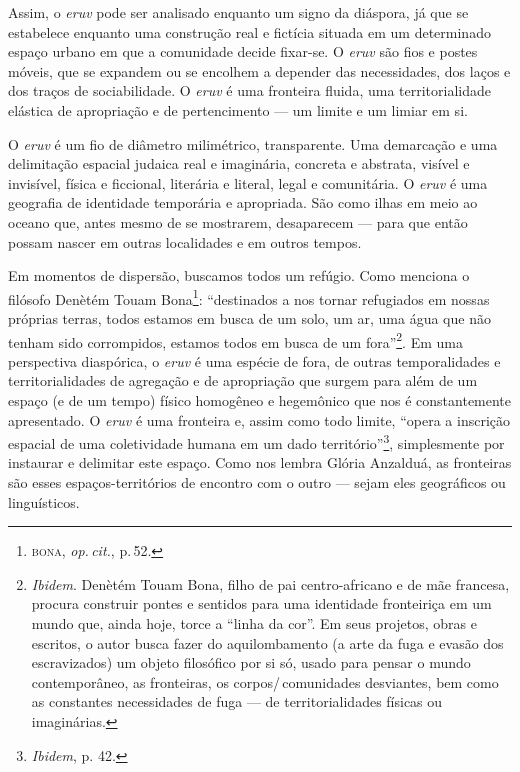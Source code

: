 Assim, o \emph{eruv} pode ser analisado enquanto um signo da diáspora,
já que se estabelece enquanto uma construção real e fictícia situada em
um determinado espaço urbano em que a comunidade decide fixar-se. O
\emph{eruv} são fios e postes móveis, que se expandem ou se encolhem a
depender das necessidades, dos laços e dos traços de sociabilidade. O
\emph{eruv} é uma fronteira fluida, uma territorialidade elástica de
apropriação e de pertencimento --- um limite e um limiar em si.

\begin{center}\end{center}

\noindent{}O \emph{eruv} é um fio de diâmetro milimétrico, transparente. Uma
demarcação e uma delimitação espacial judaica real e imaginária,
concreta e abstrata, visível e invisível, física e ficcional, literária
e literal, legal e comunitária. O \emph{eruv} é uma geografia de
identidade temporária e apropriada. São como ilhas em meio ao oceano
que, antes mesmo de se mostrarem, desaparecem --- para que então possam
nascer em outras localidades e em outros tempos.

Em momentos de dispersão, buscamos todos um refúgio. Como
menciona o filósofo Denètém Touam Bona\footnote{\textsc{bona}, \emph{op.\,cit.}, p.\,52.}:
``destinados a nos tornar refugiados em nossas próprias terras,
todos estamos em busca de um solo, um ar, uma água que não tenham sido
corrompidos, estamos todos em busca de um fora''\footnote{\emph{Ibidem}.
  Denètém Touam Bona, filho de pai centro-africano e de mãe francesa,
  procura construir pontes e sentidos para uma identidade fronteiriça em
  um mundo que, ainda hoje, torce a ``linha da cor''. Em seus
  projetos, obras e escritos, o autor busca fazer do aquilombamento (a
  arte da fuga e evasão dos escravizados) um objeto filosófico por si
  só, usado para pensar o mundo contemporâneo, as fronteiras, os
  corpos/\,comunidades desviantes, bem como as constantes necessidades de
  fuga --- de territorialidades físicas ou imaginárias.}. Em uma
perspectiva diaspórica, o \emph{eruv} é uma espécie de fora, de outras
temporalidades e territorialidades de agregação e de apropriação que
surgem para além de um espaço (e de um tempo) físico homogêneo e
hegemônico que nos é constantemente apresentado. O \emph{eruv} é uma
fronteira e, assim como todo limite, ``opera a inscrição espacial
de uma coletividade humana em um dado território''\footnote{\emph{Ibidem}, p.
  42.}, simplesmente por instaurar e delimitar este espaço. Como nos
lembra Glória Anzalduá, as fronteiras são esses espaços-territórios de
encontro com o outro --- sejam eles geográficos ou linguísticos.

